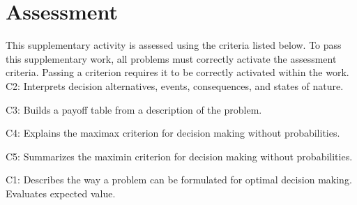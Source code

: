


	\section*{Assessment}
	This supplementary activity is assessed using the criteria listed below.
	To pass this supplementary work, all problems must correctly activate the assessment criteria.
	Passing a criterion requires it to be correctly activated within the work.
	C2: Interprets decision alternatives, events, consequences, and states of nature.\par
	C3: Builds a payoff table from a description of the problem.\par
	C4: Explains the maximax criterion for decision making without probabilities.\par
	C5: Summarizes the maximin criterion for decision making without probabilities.\par
	C1: Describes the way a problem can be formulated for optimal decision making. Evaluates expected value.\par

